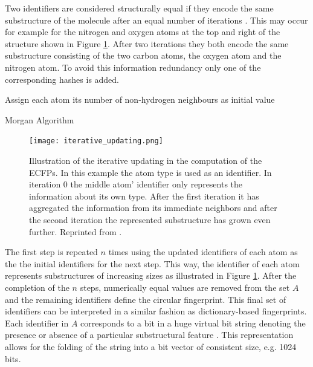 Two identifiers are considered structurally equal if they encode the same substructure of the molecule after an equal number of iterations . This may occur for example for the nitrogen and oxygen atoms at the top and right of the structure shown in Figure \ref{fig:iteration_ECFP}. After two iterations they both encode the same substructure consisting of the two carbon atoms, the oxygen atom and the nitrogen atom. To avoid this information redundancy only one of the corresponding hashes is added.
\begin{algorithm}[t]
	\SetAlgoLined
	Assign each atom its number of non-hydrogen neighbours as initial value\;
	\caption{Morgan Algorithm}
	\label{algo:morgan}
\end{algorithm}
\begin{figure}[h]
	\centering 
	\texttt{[image: iterative\_updating.png]}
	\caption{Illustration of the iterative updating in the computation of the ECFPs. In this example the atom type is used as an identifier. In iteration 0 the middle atom' identifier only represents the information about its own type. After the first iteration it has aggregated the information from its immediate neighbors and after the second iteration the represented substructure has grown even further. Reprinted from \cite{ECFP}. }
	\label{fig:iteration_ECFP}
\end{figure}
The first step is repeated $n$ times using the updated identifiers of each atom as the the initial identifiers for the next step. This way, the identifier of each atom represents substructures of increasing sizes as illustrated in Figure \ref{fig:iteration_ECFP}. After the completion of the $n$ steps, numerically equal values are removed from the set $A$ and the remaining identifiers define the circular fingerprint. This final set of identifiers can be interpreted in a similar fashion as dictionary-based fingerprints. Each identifier in $A$ corresponds to a bit in a huge virtual bit string denoting the presence or absence of a particular substructural feature \citep{ecfp_bit}. This representation allows for the folding of the string into a bit vector of consistent size, e.g. 1024 bits. 


